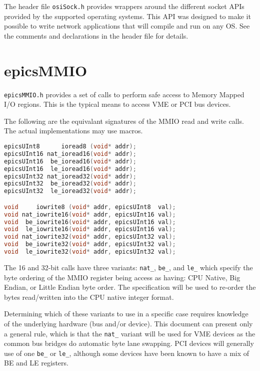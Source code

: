 The header file \verb|osiSock.h| provides wrappers around the different socket APIs provided by the supported operating systems.
This API was designed to make it possible to write network applications that will compile and run on any OS.
See the comments and declarations in the header file for details.

\section{epicsMMIO}

\verb|epicsMMIO.h| provides a set of calls to perform safe access to Memory Mapped I/O regions.
This is the typical means to access VME or PCI bus devices.

The following are the equivalant signatures of the MMIO read and write calls.
The actual implementations may use macros.

\begin{lstlisting}[language=C]
epicsUInt8      ioread8 (void* addr);
epicsUInt16 nat_ioread16(void* addr);
epicsUInt16  be_ioread16(void* addr);
epicsUInt16  le_ioread16(void* addr);
epicsUInt32 nat_ioread32(void* addr);
epicsUInt32  be_ioread32(void* addr);
epicsUInt32  le_ioread32(void* addr);

void     iowrite8 (void* addr, epicsUInt8  val);
void nat_iowrite16(void* addr, epicsUInt16 val);
void  be_iowrite16(void* addr, epicsUInt16 val);
void  le_iowrite16(void* addr, epicsUInt16 val);
void nat_iowrite32(void* addr, epicsUInt32 val);
void  be_iowrite32(void* addr, epicsUInt32 val);
void  le_iowrite32(void* addr, epicsUInt32 val);
\end{lstlisting}

The 16 and 32-bit calls have three variants: \verb|nat_|, \verb|be_|, and \verb|le_|
which specify the byte ordering of the MMIO register being access as having:
CPU Native, Big Endian, or Little Endian byte order.
The specification will be used to re-order the bytes read/written
into the CPU native integer format.

Determining which of these variants to use in a specific case
requires knowledge of the underlying hardware (bus and/or device).
This document can present only a general rule,
which is that the \verb|nat_| variant will be used
for VME devices as the common bus bridges do automatic byte lane swapping.
PCI devices will generally use of one \verb|be_| or \verb|le_|, although
some devices have been known to have a mix of BE and LE registers.

